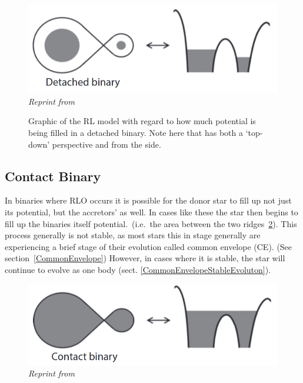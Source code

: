 \documentclass[12pt, letterpaper]{article}
\begin{document}
        
        \begin{figure}[H]
            \centering
            \includegraphics[scale = .4]{Figs/Detached binary.png}\\
            \textit{Reprint from~\cite{TaurisvandenHeuvel+2023}}
            \caption{Graphic of the RL model with regard to how much potential is being filled in a detached binary. Note here that has both a `top-down' perspective and from the side.}
            \label{DetachedBinaryRL}
        \end{figure}
        

        \subsection{\centering Contact Binary}
        In binaries where RLO occurs it is possible for the donor star to fill up not just its potential, but the accretors' as well. In cases like these the star then begins to fill up the binaries itself potential.\ (i.e.\ the area between the two ridges~\ref{ContactBinaryRL}). This process generally is not stable, as most stars this in stage generally are experiencing a brief stage of their evolution called common envelope (CE). (See section~\ref{CommonEnvelope}) However, in cases where it is stable, the star will continue to evolve as one body (sect. \ref{CommonEnvelopeStableEvoluton}).

        
        \begin{figure}
            \centering
            \includegraphics[scale = .4]{Figs/Conact Binary.png}

            \caption{\textit{Reprint from~\cite{TaurisvandenHeuvel+2023}}}
            \label{ContactBinaryRL}
        \end{figure}
        
\end{document}
